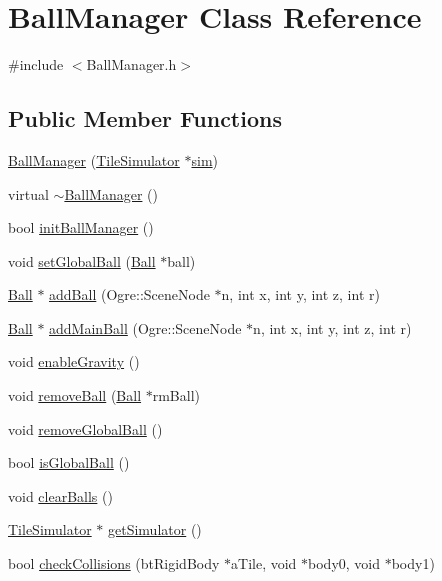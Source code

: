 \hypertarget{classBallManager}{\section{Ball\-Manager Class Reference}
\label{classBallManager}
}


{\ttfamily \#include $<$Ball\-Manager.\-h$>$}

\subsection*{Public Member Functions}
\begin{DoxyCompactItemize}
\item 
\hyperlink{classBallManager_a63b25d78645bea88f1d9742254f92305}{Ball\-Manager} (\hyperlink{classTileSimulator}{Tile\-Simulator} $\ast$\hyperlink{classBallManager_a4916de0948df0af060f6ada4d21284a7}{sim})
\item 
virtual \hyperlink{classBallManager_a1fbda83b56ce78f9fa2c0b3e1d287456}{$\sim$\-Ball\-Manager} ()
\item 
bool \hyperlink{classBallManager_af6eb7ce1ec14906c50ab69fa46eb8b11}{init\-Ball\-Manager} ()
\item 
void \hyperlink{classBallManager_a7e16e93759654ab1511acf0696e49d44}{set\-Global\-Ball} (\hyperlink{classBall}{Ball} $\ast$ball)
\item 
\hyperlink{classBall}{Ball} $\ast$ \hyperlink{classBallManager_a0391fe48835ab1816ef8f180ff8b42eb}{add\-Ball} (Ogre\-::\-Scene\-Node $\ast$n, int x, int y, int z, int r)
\item 
\hyperlink{classBall}{Ball} $\ast$ \hyperlink{classBallManager_a1eed74d1d8c6070187774fd23f79fa91}{add\-Main\-Ball} (Ogre\-::\-Scene\-Node $\ast$n, int x, int y, int z, int r)
\item 
void \hyperlink{classBallManager_a318d172c88d6e423c1d3f8dc3d5d9557}{enable\-Gravity} ()
\item 
void \hyperlink{classBallManager_aa79158dcf4c003391de0fe8750a6d0ab}{remove\-Ball} (\hyperlink{classBall}{Ball} $\ast$rm\-Ball)
\item 
void \hyperlink{classBallManager_a03aa05fe5f1a7badf3028a2749596eb1}{remove\-Global\-Ball} ()
\item 
bool \hyperlink{classBallManager_a72cf25f9ffa0152ca83103ed96ce1fe9}{is\-Global\-Ball} ()
\item 
void \hyperlink{classBallManager_af51544444357484c9e58bd63f443de57}{clear\-Balls} ()
\item 
\hyperlink{classTileSimulator}{Tile\-Simulator} $\ast$ \hyperlink{classBallManager_a73c4e097e977317ebdb53c32fe72441b}{get\-Simulator} ()
\item 
bool \hyperlink{classBallManager_aaaa28fd371dc2b04d5973f0a8ef6f956}{check\-Collisions} (bt\-Rigid\-Body $\ast$a\-Tile, void $\ast$body0, void $\ast$body1)
\end{DoxyCompactItemize}
